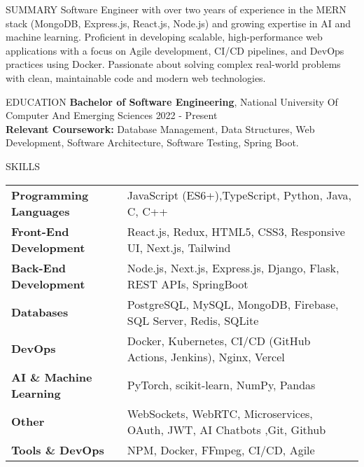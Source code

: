 \documentclass{resume}
\begin{document}

\begin{rSection}{SUMMARY}
Software Engineer with over two years of experience in the MERN stack (MongoDB, Express.js, React.js, Node.js) and growing expertise in AI and machine learning. Proficient in developing scalable, high-performance web applications with a focus on Agile development, CI/CD pipelines, and DevOps practices using Docker. Passionate about solving complex real-world problems with clean, maintainable code and modern web technologies.
\end{rSection}


\begin{rSection}{EDUCATION}
{\bf Bachelor of Software Engineering}, National University Of Computer And Emerging Sciences \hfill {2022 - Present}\\
\textbf{Relevant Coursework:} Database Management, Data Structures, Web Development, Software Architecture, Software Testing, Spring Boot.
\end{rSection}


\begin{rSection}{SKILLS}
\begin{tabular}{ @{} >{\bfseries}l @{\hspace{6ex}} l }
Programming Languages & JavaScript (ES6+),TypeScript, Python, Java, C, C++ \\
Front-End Development & React.js, Redux, HTML5, CSS3, Responsive UI, Next.js, Tailwind \\
Back-End Development & Node.js, Next.js, Express.js, Django, Flask, REST APIs, SpringBoot \\
Databases & PostgreSQL, MySQL, MongoDB, Firebase, SQL Server, Redis, SQLite \\
DevOps & Docker, Kubernetes, CI/CD (GitHub Actions, Jenkins), Nginx, Vercel \\
AI \& Machine Learning & PyTorch, scikit-learn, NumPy, Pandas \\
Other & WebSockets, WebRTC, Microservices, OAuth, JWT, AI Chatbots ,Git, Github\\Tools \& DevOps & NPM, Docker, FFmpeg, CI/CD, Agile \\
\end{tabular}
\end{rSection}
\end{document}
